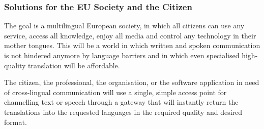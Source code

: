 \documentclass[10pt, plain]{../../metanetpaper}
\begin{document}
\begin{multicols}{2}

\subsubsection{Solutions for the EU Society and the Citizen}
\label{sec:solutions-eu-society-pt1}

The goal is a multilingual European society, in which all citizens can use any service, access all knowledge, enjoy all media and control any technology in their mother tongues. This will be a world in which written and spoken communication is not hindered anymore by language barriers and in which even specialised high-quality translation will be affordable.
 
The citizen, the professional, the organisation, or the software application in need of cross-lingual communication will use a single, simple access point for channelling text or speech through a gateway that will instantly return the translations into the requested languages in the required quality and desired format.
 

\end{multicols}
\end{document}
